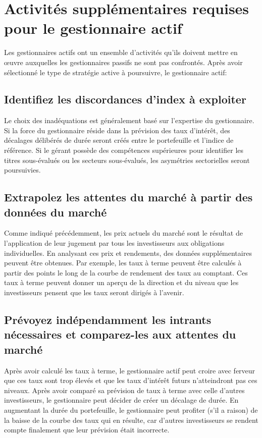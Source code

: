 \documentclass[12pt]{article}
\begin{document}
\section{Activités supplémentaires requises pour le gestionnaire actif}
Les gestionnaires actifs ont un ensemble d'activités qu'ils doivent mettre en œuvre auxquelles les gestionnaires passifs ne sont pas confrontés. Après avoir sélectionné le type de stratégie active à poursuivre, le gestionnaire actif:

\subsection{Identifiez les discordances d'index à exploiter}
Le choix des inadéquations est généralement basé sur l'expertise du gestionnaire. Si la force du gestionnaire réside dans la prévision des taux d’intérêt, des décalages délibérés de durée seront créés entre le portefeuille et l’indice de référence. Si le gérant possède des compétences supérieures pour identifier les titres sous-évalués ou les secteurs sous-évalués, les asymétries sectorielles seront poursuivies.
\subsection{Extrapolez les attentes du marché à partir des données du marché}
Comme indiqué précédemment, les prix actuels du marché sont le résultat de l'application de leur jugement par tous les investisseurs aux obligations individuelles. En analysant ces prix et rendements, des données supplémentaires peuvent être obtenues. Par exemple, les taux à terme peuvent être calculés à partir des points le long de la courbe de rendement des taux au comptant. Ces taux à terme peuvent donner un aperçu de la direction et du niveau que les investisseurs pensent que les taux seront dirigés à l'avenir.
\subsection{Prévoyez indépendamment les intrants nécessaires et comparez-les aux attentes du marché}
Après avoir calculé les taux à terme, le gestionnaire actif peut croire avec ferveur que ces taux sont trop élevés et que les taux d'intérêt futurs n'atteindront pas ces niveaux. Après avoir comparé sa prévision de taux à terme avec celle d'autres investisseurs, le gestionnaire peut décider de créer un décalage de durée. En augmentant la durée du portefeuille, le gestionnaire peut profiter (s’il a raison) de la baisse de la courbe des taux qui en résulte, car d’autres investisseurs se rendent compte finalement que leur prévision était incorrecte.
\end{document}
